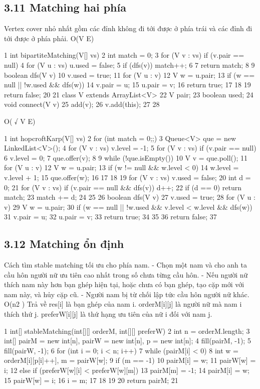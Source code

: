 \documentclass[11pt]{article}
\begin{document}
\subsection{3.11 Matching hai phía}
\begin{NoteBlock}
Vertex cover nhỏ nhất gồm các đỉnh không đi tới được ở phía trái và các đỉnh đi tới được ở phía phải.
O(V E)
\end{NoteBlock}
\begin{Code}
1 int bipartiteMatching(V[] vs) {
2 int match = 0;
3 for (V v : vs) if (v.pair == null) {
4 for (V u : vs) u.used = false;
5 if (dfs(v)) match++;
6 }
7 return match;
8 }
9 boolean dfs(V v) {
10 v.used = true;
11 for (V u : v) {
12 V w = u.pair;
13 if (w == null || !w.used && dfs(w)) {
14 v.pair = u;
15 u.pair = v;
16 return true;
17 }
18 }
19 return false;
20 }
21 class V extends ArrayList<V> {
22 V pair;
23 boolean used;
24 void connect(V v) {
25 add(v);
26 v.add(this);
27 }
28 }
\end{Code}
\begin{NoteBlock}
O(
√
V E)
\end{NoteBlock}
\begin{Code}
1 int hopcroftKarp(V[] vs) {
2 for (int match = 0;;) {
3 Queue<V> que = new LinkedList<V>();
4 for (V v : vs) v.level = -1;
5 for (V v : vs) if (v.pair == null) {
6 v.level = 0;
7 que.offer(v);
8 }
9 while (!que.isEmpty()) {
10 V v = que.poll();
11 for (V u : v) {
12 V w = u.pair;
13 if (w != null && w.level < 0) {
14 w.level = v.level + 1;
15 que.offer(w);
16 }
17 }
18 }
19 for (V v : vs) v.used = false;
20 int d = 0;
21 for (V v : vs) if (v.pair == null && dfs(v)) d++;
22 if (d == 0) return match;
23 match += d;
24 }
25 }
26 boolean dfs(V v) {
27 v.used = true;
28 for (V u : v) {
29 V w = u.pair;
30 if (w == null || !w.used && v.level < w.level && dfs(w)) {
31 v.pair = u;
32 u.pair = v;
33 return true;
34 }
35 }
36 return false;
37 }
\end{Code}
\subsection{3.12 Matching ổn định}
\begin{NoteBlock}
Cách tìm stable matching tối ưu cho phía nam.
- Chọn một nam và cho anh ta cầu hôn người nữ ưu tiên cao nhất trong số chưa từng cầu hôn.
- Nếu người nữ thích nam này hơn bạn ghép hiện tại, hoặc chưa có bạn ghép, tạo cặp mới với nam này,
và hủy cặp cũ.
- Người nam bị từ chối lập tức cầu hôn người nữ khác.
O(n2
)
Trả về res[i] là bạn ghép của nam i.
orderM[i][j] là người nữ mà nam i thích thứ j.
preferW[i][j] là thứ hạng ưu tiên của nữ i đối với nam j.
\end{NoteBlock}
\begin{Code}
1 int[] stableMatching(int[][] orderM, int[][] preferW) {
2 int n = orderM.length;
3 int[] pairM = new int[n], pairW = new int[n], p = new int[n];
4 fill(pairM, -1);
5 fill(pairW, -1);
6 for (int i = 0; i < n; i++) {
7 while (pairM[i] < 0) {
8 int w = orderM[i][p[i]++], m = pairW[w];
9 if (m == -1) {
10 pairM[i] = w;
11 pairW[w] = i;
12 } else if (preferW[w][i] < preferW[w][m]) {
13 pairM[m] = -1;
14 pairM[i] = w;
15 pairW[w] = i;
16 i = m;
17 }
18 }
19 }
20 return pairM;
21 }
\end{Code}
\end{document}
